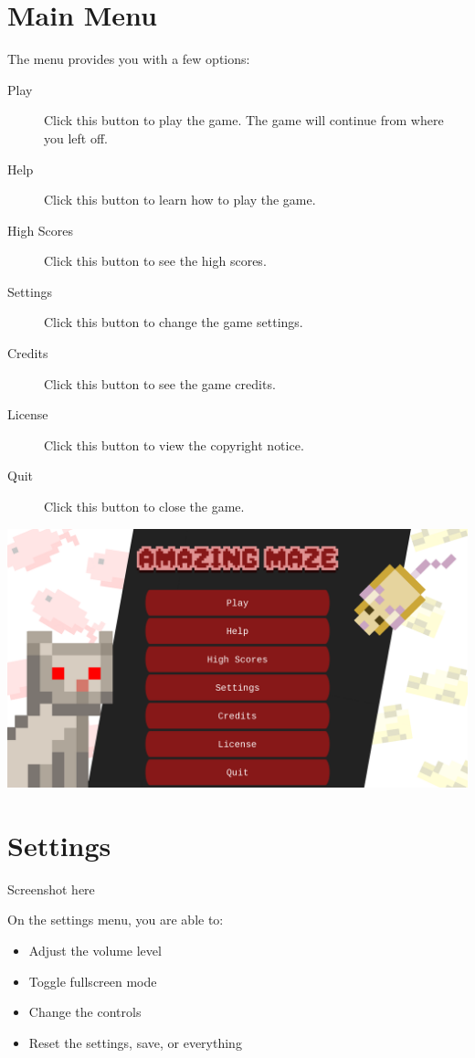 \documentclass[12pt]{book}
\begin{document}
	\chapter{Main Menu}
		The menu provides you with a few options:
		\begin{description}
			\item[Play] Click this button to play the game. The game will continue from where you left off.
			\item[Help] Click this button to learn how to play the game.
			\item[High Scores] Click this button to see the high scores.
			\item[Settings] Click this button to change the game settings.
			\item[Credits] Click this button to see the game credits.
			\item[License] Click this button to view the copyright notice.
			\item[Quit] Click this button to close the game.
		\end{description}
		\newpage
		\vspace*{\fill}
		\includegraphics[width=\textwidth]{MainMenu}
		\vspace*{\fill}
	\chapter{Settings}
		\begin{center}
			\vspace{2cm}
			\Huge
			Screenshot here		
		\end{center}
		On the settings menu, you are able to:
		\begin{itemize}
			\item Adjust the volume level
			\item Toggle fullscreen mode
			\item Change the controls
			\item Reset the settings, save, or everything
		\end{itemize}
\end{document}
